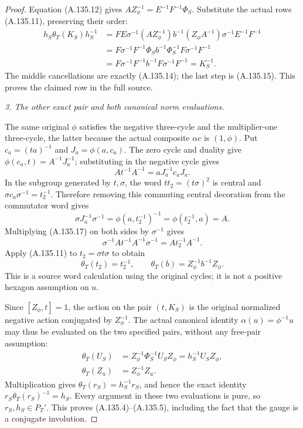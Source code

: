 \begin{proof}
Equation (A.135.12) gives
\(AZ_\phi^{-1}=E^{-1}F^{-1}\Phi_S\). Substitute the actual
rows (A.135.11), preserving their order:
\[
 \begin{aligned}
 h_S\theta_T(K_S)h_S^{-1}
 &=FE\sigma^{-1}(AZ_\phi^{-1})b^{-1}
       (Z_\phi A^{-1})\sigma^{-1}E^{-1}F^{-1}\\
 &=F\sigma^{-1}F^{-1}\Phi_S b^{-1}\Phi_S^{-1}
       F\sigma^{-1}F^{-1}\\
 &=F\sigma^{-1}F^{-1}b^{-1}F\sigma^{-1}F^{-1}
 =K_S^{-1}.
 \end{aligned}
 \tag{A.135.16}
\]
The middle cancellations are exactly (A.135.14); the last step is
(A.135.15). This proves the claimed row in the full source.

\emph{3. The other exact pair and both canonical norm evaluations.}\par
The same original \(\phi\) satisfies the negative three-cycle
and the multiplier-one three-cycle, the latter because the actual
composite \(\alpha c\) is \((1,\phi)\). Put
\(c_a=(ta)^{-1}\) and \(J_a=\phi(a,c_a)\). The zero cycle and
duality give \(\phi(c_a,t)=A^{-1}J_a^{-1}\); substituting in the
negative cycle gives
\[
                    At^{-1}A^{-1}=aJ_a^{-1}c_aJ_a.
 \tag{A.135.17}
\]
In the subgroup generated by \(t,\sigma\), the word
\(t t_2=(t\sigma)^2\) is central and
\(\sigma c_a\sigma^{-1}=t_2^{-1}\). Therefore removing this
commuting central decoration from the commutator word gives
\[
 \sigma J_a^{-1}\sigma^{-1}
   =\phi(a,t_2^{-1})^{-1}
   =\phi(t_2^{-1},a)=A.
\]
Multiplying (A.135.17) on both sides by \(\sigma^{-1}\) gives
\[
 \sigma^{-1}At^{-1}A^{-1}\sigma^{-1}
       =At_2^{-1}A^{-1}.
\]
Apply (A.135.11) to \(t_2=\sigma t\sigma\) to obtain
\[
 \theta_T(t_2)=t_2^{-1},\qquad
 \theta_T(b)=Z_\phi^{-1}b^{-1}Z_\phi.
 \tag{A.135.18}
\]
This is a source word calculation using the original cycles; it is
not a positive hexagon assumption on \(u\).

Since \([Z_\phi,t]=1\), the action on the pair \((t,K_S)\) is
the original normalized negative action conjugated by
\(Z_\phi^{-1}\). The actual canonical identity
\(\alpha(u)=\phi^{-1}u\) may thus be evaluated on the two
specified pairs, without any free-pair assumption:
\[
 \begin{aligned}
 \theta_T(U_S)
   &=Z_\phi^{-1}\Phi_S^{-1}U_SZ_\phi
     =h_S^{-1}U_SZ_\phi,\\
 \theta_T(Z_u)&=Z_\phi^{-1}Z_u.
 \end{aligned}
 \tag{A.135.19}
\]
Multiplication gives \(\theta_T(r_S)=h_S^{-1}r_S\), and hence
the exact identity \(r_S\theta_T(r_S)^{-1}=h_S\).
Every argument in these two evaluations is pure, so
\(r_S,h_S\in P_T'\). This proves (A.135.4)--(A.135.5),
including the fact that the gauge is a conjugate involution.


\end{proof}

